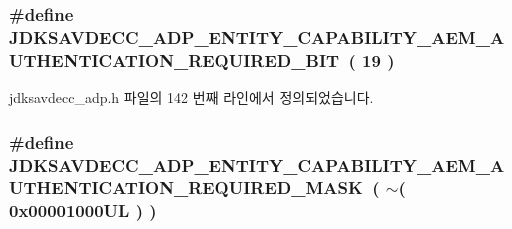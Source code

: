 \subsubsection[{\texorpdfstring{J\+D\+K\+S\+A\+V\+D\+E\+C\+C\+\_\+\+A\+D\+P\+\_\+\+E\+N\+T\+I\+T\+Y\+\_\+\+C\+A\+P\+A\+B\+I\+L\+I\+T\+Y\+\_\+\+A\+E\+M\+\_\+\+A\+U\+T\+H\+E\+N\+T\+I\+C\+A\+T\+I\+O\+N\+\_\+\+R\+E\+Q\+U\+I\+R\+E\+D\+\_\+\+B\+IT}{JDKSAVDECC_ADP_ENTITY_CAPABILITY_AEM_AUTHENTICATION_REQUIRED_BIT}}]{\setlength{\rightskip}{0pt plus 5cm}\#define J\+D\+K\+S\+A\+V\+D\+E\+C\+C\+\_\+\+A\+D\+P\+\_\+\+E\+N\+T\+I\+T\+Y\+\_\+\+C\+A\+P\+A\+B\+I\+L\+I\+T\+Y\+\_\+\+A\+E\+M\+\_\+\+A\+U\+T\+H\+E\+N\+T\+I\+C\+A\+T\+I\+O\+N\+\_\+\+R\+E\+Q\+U\+I\+R\+E\+D\+\_\+\+B\+IT~( 19 )}\hypertarget{group__adp__entity__capability_ga4e8b2aec5591b406eb8546cef06d1a87}{}\label{group__adp__entity__capability_ga4e8b2aec5591b406eb8546cef06d1a87}


jdksavdecc\+\_\+adp.\+h 파일의 142 번째 라인에서 정의되었습니다.

\subsubsection[{\texorpdfstring{J\+D\+K\+S\+A\+V\+D\+E\+C\+C\+\_\+\+A\+D\+P\+\_\+\+E\+N\+T\+I\+T\+Y\+\_\+\+C\+A\+P\+A\+B\+I\+L\+I\+T\+Y\+\_\+\+A\+E\+M\+\_\+\+A\+U\+T\+H\+E\+N\+T\+I\+C\+A\+T\+I\+O\+N\+\_\+\+R\+E\+Q\+U\+I\+R\+E\+D\+\_\+\+M\+A\+SK}{JDKSAVDECC_ADP_ENTITY_CAPABILITY_AEM_AUTHENTICATION_REQUIRED_MASK}}]{\setlength{\rightskip}{0pt plus 5cm}\#define J\+D\+K\+S\+A\+V\+D\+E\+C\+C\+\_\+\+A\+D\+P\+\_\+\+E\+N\+T\+I\+T\+Y\+\_\+\+C\+A\+P\+A\+B\+I\+L\+I\+T\+Y\+\_\+\+A\+E\+M\+\_\+\+A\+U\+T\+H\+E\+N\+T\+I\+C\+A\+T\+I\+O\+N\+\_\+\+R\+E\+Q\+U\+I\+R\+E\+D\+\_\+\+M\+A\+SK~( $\sim$( 0x00001000\+U\+L ) )}\hypertarget{group__adp__entity__capability_ga238b754ed39778dfb7612db8f3484dc3}{}\label{group__adp__entity__capability_ga238b754ed39778dfb7612db8f3484dc3}


